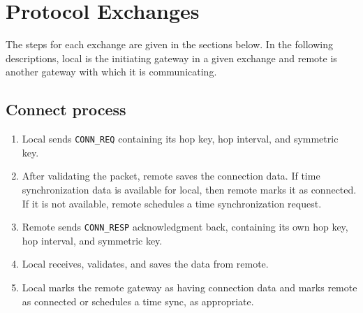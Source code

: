\section{Protocol Exchanges}
\label{sec:arg_protocol_exchanges}
\par The steps for each exchange are given in the sections below. In the following descriptions, local is the initiating gateway in a given exchange and remote is another gateway with which it is communicating.

\subsection{Connect process}
\begin{enumerate}
	\item Local sends \texttt{CONN\_REQ} containing its hop key, hop interval, and symmetric key. 
	\item After validating the packet, remote saves the connection data. If time synchronization data is available for local, then remote marks it as connected. If it is not available, remote schedules a time synchronization request.
	\item Remote sends \texttt{CONN\_RESP} acknowledgment back, containing its own hop key, hop interval, and symmetric key. 
	\item Local receives, validates, and saves the data from remote.
	\item Local marks the remote gateway as having connection data and marks remote as connected or schedules a time sync, as appropriate.
\end{enumerate}

